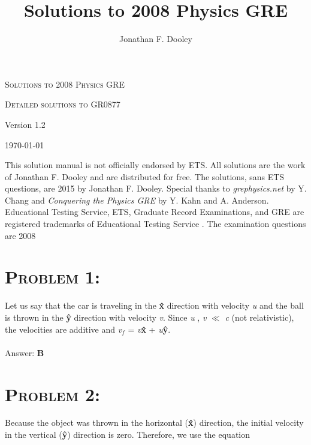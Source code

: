 \documentclass{article}
\title{Solutions to 2008 Physics GRE}
\author{Jonathan F. Dooley}
\begin{document}
\begin{titlepage}
\centering
{\scshape\LARGE Solutions to 2008 Physics GRE \par}
\vspace{.5cm}

{\scshape\Large Detailed solutions to GR0877\par}
\vspace{6cm}

{\huge Version 1.2 \par}
\vspace{1cm}
{\large \today\par}
\vspace{6cm}

This solution manual is not officially endorsed by ETS. All solutions are the work of Jonathan F. Dooley and are distributed for free. The solutions, sans ETS questions, are \textcopyright  \hspace{.001in} 2015 by Jonathan F. Dooley. Special thanks to \textit{grephysics.net} by Y. Chang and \textit{Conquering the Physics GRE} by Y. Kahn and A. Anderson. Educational Testing Service, ETS, Graduate Record Examinations, and GRE are registered trademarks of Educational Testing Service \hspace{.001in} \textregistered. The examination questions are \textcopyright  \hspace{.001in} 2008
\end{titlepage}


\section{\textsc{Problem 1:}}
Let us say that the car is traveling in the \textbf{\^{x}} direction with velocity \textit{u} and the ball is thrown in the \textbf{\^{y}} direction with velocity \textit{v}. Since \textit{u} , \textit{v} $\ll$ \textit{c} (not relativistic), the velocities are additive and \textit{v$_f$} = \textit{v}\textbf{\^{x}} + \textit{u}\textbf{\^{y}}.
\\\\
Answer: \textbf{\textcolor{ProcessBlue}B}\\


\section{\textsc{Problem 2:}} Because the object was thrown in the horizontal (\textbf{\^{x}}) direction, the initial velocity in the vertical (\textbf{\^{y}}) direction is zero. Therefore, we use the equation
\end{document}
